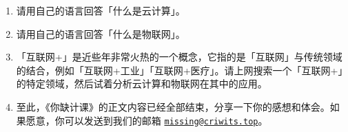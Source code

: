 \practice

\begin{enumerate}
  \item 请用自己的语言回答「什么是云计算」。
  \item 请用自己的语言回答「什么是物联网」。
  \item 「互联网+」是近些年非常火热的一个概念，它指的是「互联网」与传统领域的结合，例如「互联网+工业」「互联网+医疗」。请上网搜索一个「互联网+」的特定领域，然后试着分析云计算和物联网在其中的应用。
  \item 至此，《你缺计课》的正文内容已经全部结束，分享一下你的感想和体会。如果愿意，你可以发送到我们的邮箱 \href{mailto:missing@criwits.top}{\texttt{missing@criwits.top}}。
\end{enumerate}